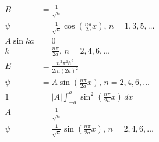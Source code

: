 \documentclass{article}
\begin{document}
\begin{align*}
  B                                           & = \frac{1}{\sqrt{a}}                                                                \\
  \psi                                        & = \frac{1}{\sqrt{a}} \cos \left( \frac{n \pi}{2 a} x \right), \,n = 1, 3, 5, \ldots \\
  A \sin k a                                  & = 0                                                                                 \\
  k                                           & = \frac{n \pi}{2 a}, \,n = 2, 4, 6, \ldots                                          \\
  E                                           & = \frac{n^2 \pi^2 \hbar^2}{2 m (2 a)^2}                                             \\
  \psi                                        & = A \sin \left( \frac{n \pi}{2 a} x \right), \,n = 2, 4, 6, \ldots                  \\
  1                                           & = |A| \int_{-a}^a \sin^2 \left( \frac{n \pi}{2 a} x \right) \,d x                   \\
  A                                           & = \frac{1}{\sqrt{a}}                                                                \\
  \psi                                        & = \frac{1}{\sqrt{a}} \sin \left( \frac{n \pi}{2 a} x \right), \,n = 2, 4, 6, \ldots
\end{align*}

\subsection{}
\end{document}
